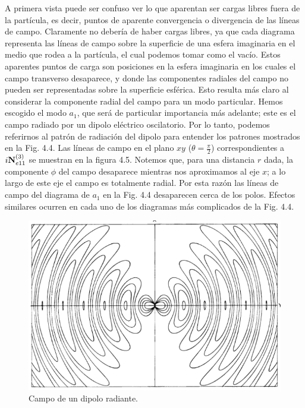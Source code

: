\documentclass[graybox]{svmult}
\begin{document}
A primera vista puede ser confuso ver lo que aparentan ser cargas libres fuera de la partícula, es decir, puntos de aparente convergencia o divergencia de las líneas de campo. Claramente no debería de haber cargas libres, ya que cada diagrama representa las líneas de campo sobre la superficie de una esfera imaginaria en el medio que rodea a la partícula, el cual podemos tomar como el vacío. Estos aparentes puntos de carga son posiciones en la esfera imaginaria en los cuales el campo transverso desaparece, y donde las componentes radiales del campo no pueden ser representadas sobre la superficie esférica. Esto resulta más claro al considerar la componente radial del campo para un modo particular. Hemos escogido el modo $a_1$, que será de particular importancia más adelante; este es el campo radiado por un dipolo eléctrico oscilatorio. Por lo tanto, podemos referirnos al patrón de radiación del dipolo para entender los patrones mostrados en la Fig. 4.4. Las líneas de campo en el plano $xy$ ($\theta = \frac{\pi}{2}$) correspondientes a $i\bold{N}_{e11}^{(3)}$ se muestran en la figura 4.5. Notemos que, para una distancia $r$ dada, la componente $\phi$ del campo desaparece mientras nos aproximamos al eje $x$; a lo largo de este eje el campo es totalmente radial. Por esta razón las líneas de campo del diagrama de $a_1$ en la Fig. 4.4 desaparecen cerca de los polos. Efectos similares ocurren en cada uno de los diagramas más complicados de la Fig. 4.4.

\begin{figure}[H]
\centering
\captionsetup{justification=centering}
\includegraphics[width=1\textwidth]{Radiating_Dipole.png}
\caption{Campo de un dipolo radiante.}
\label{Fig 4.4}
\end{figure}
\end{document}
